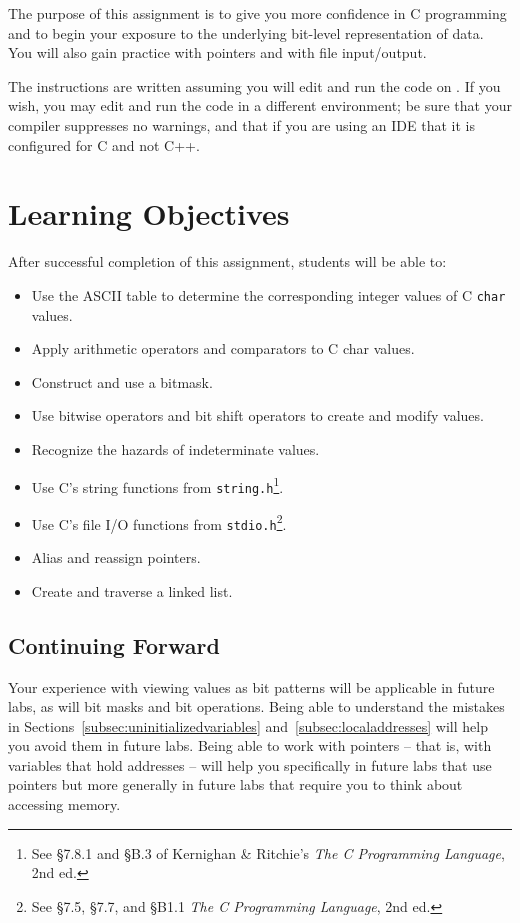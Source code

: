 The purpose of this assignment is to give you more confidence in C programming and to begin your exposure to the underlying bit-level representation of data.
You will also gain practice with pointers and with file input/output.

The instructions are written assuming you will edit and run the code on \runtimeenvironment.
If you wish, you may edit and run the code in a different environment;
be sure that your compiler suppresses no warnings, and that if you are using an IDE that it is configured for C and not C++.

\section*{Learning Objectives}

After successful completion of this assignment, students will be able to:
\begin{itemize}
    \item Use the ASCII table to determine the corresponding integer values of C \lstinline{char} values.
    \item Apply arithmetic operators and comparators to C \lstinline{}{char} values.
    \item Construct and use a bitmask.
    \item Use bitwise operators and bit shift operators to create and modify values.
    \item Recognize the hazards of indeterminate values.
    \item Use C's string functions from \lstinline{string.h}\footnote{See \S7.8.1 and \S{}B.3 of Kernighan \& Ritchie's \textit{The C Programming Language}, 2nd ed.}.
    \item Use C's file I/O functions from \lstinline{stdio.h}\footnote{See \S7.5, \S7.7, and \S{}B1.1 \textit{The C Programming Language}, 2nd ed.}.
    \item Alias and reassign pointers.
    \item Create and traverse a linked list.
\end{itemize}

\subsection*{Continuing Forward}

Your experience with viewing values as bit patterns will be applicable in future labs, as will bit masks and bit operations.
Being able to understand the mistakes in Sections~\ref{subsec:uninitializedvariables} and~\ref{subsec:localaddresses} will help you avoid them in future labs.
Being able to work with pointers -- that is, with variables that hold addresses -- will help you specifically in future labs that use pointers but more generally in future labs that require you to think about accessing memory.

